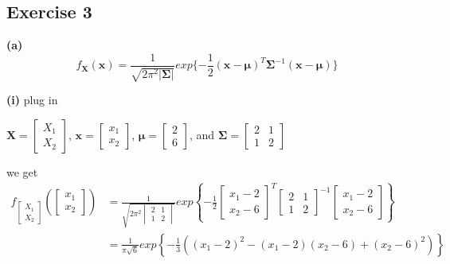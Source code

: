 \documentclass[11pt]{article}
\begin{document}
\subsection*{Exercise 3}

\noindent\textbf{(a)}
$$f_\textbf{X}(\textbf{x})=\frac{1}{\sqrt{2\pi^2|\pmb{\Sigma}|}}exp\{-\frac{1}{2}(\textbf{x}-\pmb{\mu})^T\pmb{\Sigma}^{-1}(\textbf{x}-\pmb{\mu})\}$$

\textbf{(i)}
plug in\\

\begin{center}
$\textbf{X}=\begin{bmatrix} X_1 \\ X_2 \end{bmatrix}$, 
$\textbf{x}=\begin{bmatrix} x_1 \\ x_2 \end{bmatrix}$,
$\pmb{\mu}=\begin{bmatrix} 2 \\ 6 \end{bmatrix}$,
  and  $\pmb{\Sigma}=\begin{bmatrix} 2 & 1 \\ 1 & 2 \end{bmatrix} $
\end{center}

we get\\
\begin{equation}
\begin{split}
f_{\begin{bmatrix} X_1 \\ X_2 \end{bmatrix}}\left(\begin{bmatrix} x_1 \\ x_2 \end{bmatrix}\right)&=\frac{1}{\sqrt{2\pi^2\begin{vmatrix} 2 & 1 \\ 1 & 2 \end{vmatrix}}}exp\left\{-\frac{1}{2}\begin{bmatrix} x_1-2 \\ x_2-6 \end{bmatrix}^T\begin{bmatrix} 2 & 1 \\ 1 & 2 \end{bmatrix}^{-1}\begin{bmatrix} x_1-2 \\ x_2-6 \end{bmatrix}\right\}\\
&=\frac{1}{\pi\sqrt{6}}exp\left\{-\frac{1}{3}\left((x_1-2)^2-(x_1-2)(x_2-6)+(x_2-6)^2\right)\right\}\\
\end{split}
\end{equation}
\end{document}
